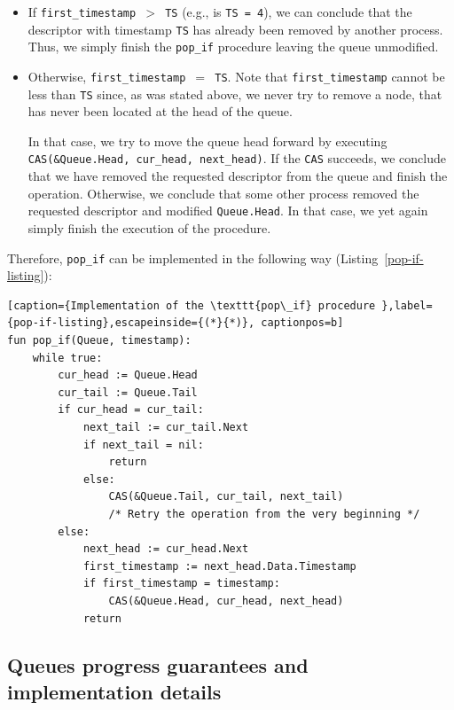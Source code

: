 \documentclass[times, dvipsnames,%
               languages={russian,english} %
              ]{itmo-student-thesis}
\begin{document}
\begin{nenum}
    \begin{itemize}
        \item If \texttt{first\_timestamp $>$ TS} (e.g., is \texttt{TS = 4}), we can conclude that the descriptor with timestamp \texttt{TS} has already been removed by another process. Thus, we simply finish the \texttt{pop\_if} procedure leaving the queue unmodified.
    
        \item Otherwise, \texttt{first\_timestamp $=$ TS}. Note that \texttt{first\_timestamp} cannot be less than \texttt{TS} since, as was stated above, we never try to remove a node, that has never been located at the head of the queue. 
        
        In that case, we try to move the queue head forward by executing \texttt{CAS(\&Queue.Head, cur\_head, next\_head)}. If the \texttt{CAS} succeeds, we conclude that we have removed the requested descriptor from the queue and finish the operation. Otherwise, we conclude that some other process removed the requested descriptor and modified \texttt{Queue.Head}. In that case, we yet again simply finish the execution of the procedure.
    \end{itemize}
\end{nenum}

Therefore, \texttt{pop\_if} can be implemented in the following way (Listing~\ref{pop-if-listing}):

\renewcommand{\lstlistingname}{Listing}
\begin{lstlisting}[caption={Implementation of the \texttt{pop\_if} procedure },label={pop-if-listing},escapeinside={(*}{*)}, captionpos=b]
fun pop_if(Queue, timestamp):
    while true:
        cur_head := Queue.Head
        cur_tail := Queue.Tail
        if cur_head = cur_tail:
            next_tail := cur_tail.Next
            if next_tail = nil:
                return
            else:
                CAS(&Queue.Tail, cur_tail, next_tail)
                /* Retry the operation from the very beginning */
        else:
            next_head := cur_head.Next
            first_timestamp := next_head.Data.Timestamp
            if first_timestamp = timestamp:
                CAS(&Queue.Head, cur_head, next_head)
            return
\end{lstlisting}

\subsection{Queues progress guarantees and implementation details}
\end{document}
